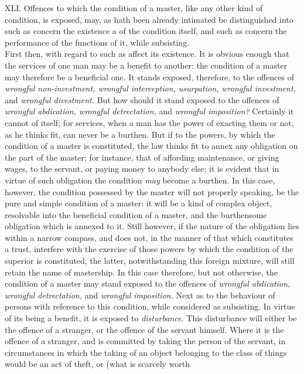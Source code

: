 \documentclass[12pt]{report}
\begin{document}
XLI. Offences to which the condition of a master, like any other kind of
condition, is exposed, may, as hath been already intimated be
distinguished into such as concern the existence a of the condition
itself, and such as concern the performance of the functions of it,
while subsisting.\\
First then, with regard to such as affect its existence. It is obvious
enough that the services of one man may be a benefit to another: the
condition of a master may therefore be a beneficial one. It stands
exposed, therefore, to the offences of \emph{wrongful non-investment,
wrongful interception, usurpation, wrongful investment,} and
\emph{wrongful divestment.} But how should it stand exposed to the
offences of \emph{wrongful abdication, wrongful detrectation,} and
\emph{wrongful imposition?} Certainly it cannot of itself; for services,
when a man has the power of exacting them or not, as he thinks fit, can
never be a burthen. But if to the powers, by which the condition of a
master is constituted, the law thinks fit to annex any obligation on the
part of the master; for instance, that of affording maintenance, or
giving wages, to the servant, or paying money to anybody else; it is
evident that in virtue of such obligation the condition \emph{may}
become a burthen. In this case, however, the condition possessed by the
master will not properly speaking, be the pure and simple condition of a
master: it will be a kind of complex object, resolvable into the
beneficial condition of a master, and the burthensome obligation which
is annexed to it. Still however, if the nature of the obligation lies
within a narrow compass, and does not, in the manner of that which
constitutes a trust, interfere with the exercise of those powers by
which the condition of the superior is constituted, the latter,
notwithstanding this foreign mixture, will still retain the name of
mastership. In this case therefore, but not otherwise, the condition of
a master may stand exposed to the offences of \emph{wrongful abdication,
wrongful detrectation,} and \emph{wrongful imposition.} Next as to the
behaviour of persons with reference to this condition, while considered
as subsisting. In virtue of its being a benefit, it is exposed to
\emph{disturbance.} This disturbance will either be the offence of a
stranger, or the offence of the servant himself. Where it is the offence
of a stranger, and is committed by taking the person of the servant, in
circumstances in which the taking of an object belonging to the class of
things would be an act of theft, or (what is scarcely worth
\end{document}
